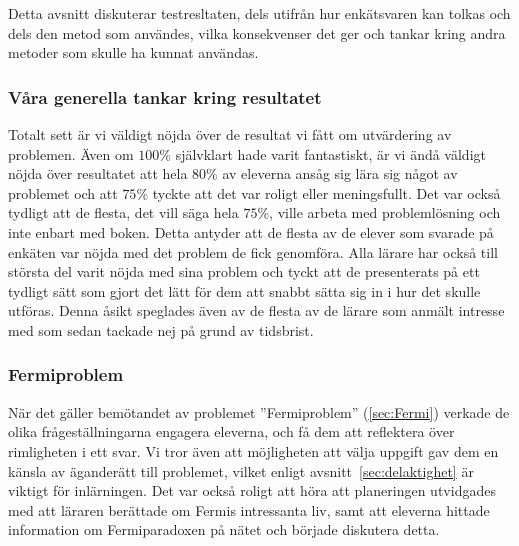 \textcolor{lila}{Detta avsnitt diskuterar testresltaten, dels utifrån hur enkätsvaren kan tolkas och dels den metod som användes, vilka konsekvenser det ger och tankar kring andra metoder som skulle ha kunnat användas.}
    
    \subsubsection{Våra generella tankar kring resultatet}
    \textcolor{lila}{Totalt sett är vi väldigt nöjda  över de resultat vi fått om utvärdering av problemen. Även om $100\%$ självklart hade varit fantastiskt, är vi ändå väldigt nöjda över resultatet att hela $80\%$ av eleverna ansåg sig lära sig något av problemet och att $75\%$ tyckte att det var roligt eller meningsfullt. Det var också tydligt att de flesta, det vill säga hela $75\%$, ville arbeta med problemlösning och inte enbart med boken. Detta antyder att de flesta av de elever som svarade  på enkäten var nöjda med det problem de fick genomföra. Alla lärare har också till största del varit nöjda med sina problem och tyckt att de presenterats på ett tydligt sätt som gjort det lätt för dem att snabbt sätta sig in i hur det skulle utföras. Denna åsikt speglades även av de flesta av de lärare som anmält intresse med som sedan tackade nej på grund av tidsbrist.}

\subsubsection{Fermiproblem}
    \textcolor{lila}{När det gäller bemötandet av problemet ''Fermiproblem'' (\ref{sec:Fermi}) verkade de olika frågeställningarna engagera eleverna, och få dem att reflektera över rimligheten i ett svar. Vi tror även att möjligheten att välja uppgift gav dem en känsla av äganderätt till problemet, vilket enligt avsnitt~\ref{sec:delaktighet} är viktigt för inlärningen. Det var också roligt att höra att planeringen utvidgades med att läraren berättade om Fermis intressanta liv, samt att eleverna hittade information om Fermiparadoxen på nätet och började diskutera detta.}

